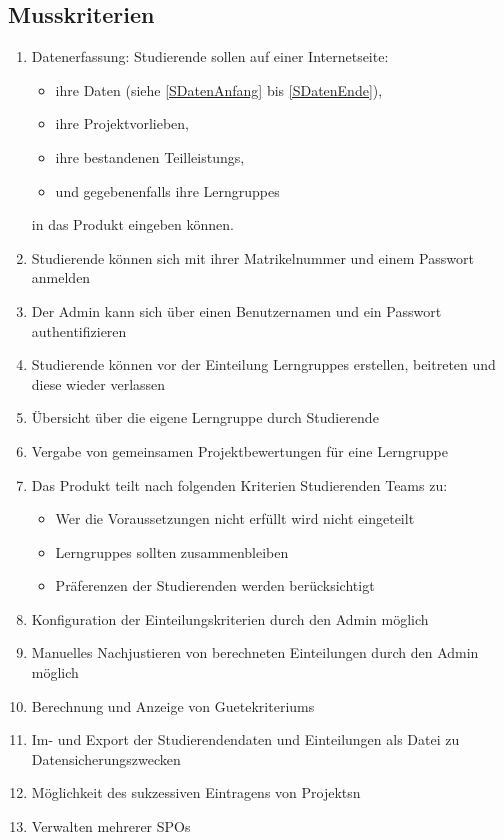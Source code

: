 \documentclass[parskip=full]{scrartcl}
\newcommand{\swtLabel}[1]{\textbf{/#1\arabic*0/}}
\begin{document}
\subsection{Musskriterien}
 \begin{enumerate}[label=\swtLabel{M}]
   \item Datenerfassung: Studierende sollen auf einer Internetseite:   
   \begin{itemize}
     \item ihre Daten (siehe \ref{SDatenAnfang} bis \ref{SDatenEnde}),     
     \item ihre Projektvorlieben, 
     \item ihre bestandenen \glspl{Teilleistung},
     \item und gegebenenfalls ihre \glspl{Lerngruppe}
   \end{itemize}
   in das Produkt eingeben können.
   \item Studierende können sich mit ihrer Matrikelnummer und einem Passwort anmelden
   \item Der \gls{Admin} kann sich über einen Benutzernamen und ein Passwort authentifizieren
   \item Studierende können vor der Einteilung \glspl{Lerngruppe} erstellen, beitreten
    und diese wieder verlassen
    \item Übersicht über die eigene \gls{Lerngruppe} durch Studierende
    \item Vergabe von gemeinsamen \gls{Projekt}bewertungen für eine Lerngruppe
   \item Das Produkt teilt nach folgenden Kriterien Studierenden Teams zu:
   \label{Mzuteilung}
   \begin{itemize}
     \item Wer die Voraussetzungen nicht erfüllt wird nicht eingeteilt
     \item \glspl{Lerngruppe} sollten zusammenbleiben
     \item Präferenzen der Studierenden werden berücksichtigt
   \end{itemize}
     \item Konfiguration der Einteilungskriterien durch den \gls{Admin} möglich
   \item Manuelles Nachjustieren von berechneten Einteilungen durch den \gls{Admin} möglich
   \item Berechnung und Anzeige von \glspl{Guetekriterium}
   \item Im- und Export der Studierendendaten und
   Einteilungen als Datei zu Datensicherungszwecken
   \item Möglichkeit des sukzessiven Eintragens von \glspl{Projekt}n
   \item Verwalten mehrerer \glspl{SPO}
  
 \end{enumerate}
\end{document}
